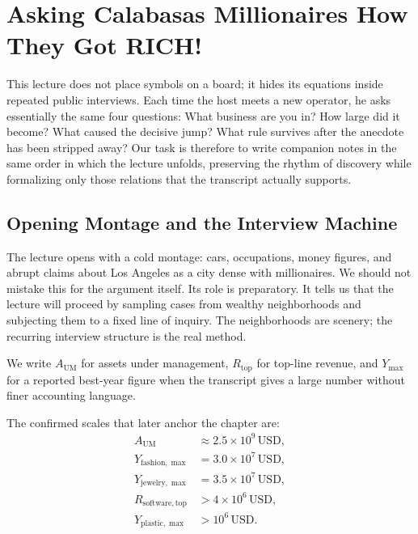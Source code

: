\chapter{Asking Calabasas Millionaires How They Got RICH!}

This lecture does not place symbols on a board; it hides its equations inside repeated public interviews. Each time the host meets a new operator, he asks essentially the same four questions: What business are you in? How large did it become? What caused the decisive jump? What rule survives after the anecdote has been stripped away? Our task is therefore to write companion notes in the same order in which the lecture unfolds, preserving the rhythm of discovery while formalizing only those relations that the transcript actually supports.

\section{Opening Montage and the Interview Machine}

The lecture opens with a cold montage: cars, occupations, money figures, and abrupt claims about Los Angeles as a city dense with millionaires. We should not mistake this for the argument itself. Its role is preparatory. It tells us that the lecture will proceed by sampling cases from wealthy neighborhoods and subjecting them to a fixed line of inquiry. The neighborhoods are scenery; the recurring interview structure is the real method.

\begin{definition}
We write \(A_{\mathrm{UM}}\) for assets under management, \(R_{\mathrm{top}}\) for top-line revenue, and \(Y_{\max}\) for a reported best-year figure when the transcript gives a large number without finer accounting language.
\end{definition}

The confirmed scales that later anchor the chapter are:
\begin{align}
A_{\mathrm{UM}} &\approx 2.5\times 10^9 \,\mathrm{USD},\\
Y_{\mathrm{fashion},\max} &= 3.0\times 10^7 \,\mathrm{USD},\\
Y_{\mathrm{jewelry},\max} &= 3.5\times 10^7 \,\mathrm{USD},\\
R_{\mathrm{software},\mathrm{top}} &> 4\times 10^6 \,\mathrm{USD},\\
Y_{\mathrm{plastic},\max} &> 10^6 \,\mathrm{USD}.
\end{align}

